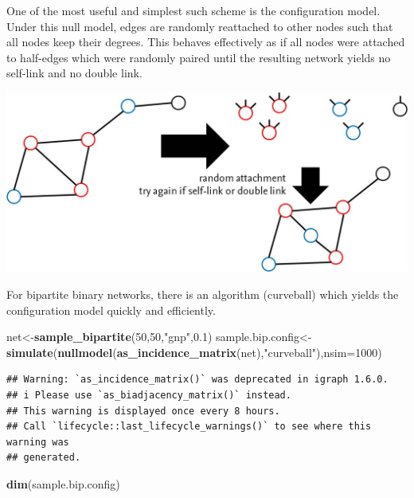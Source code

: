 \documentclass[
]{book}
\newenvironment{Shaded}{\begin{snugshade}}{\end{snugshade}}
\newcommand{\AttributeTok}[1]{\textcolor[rgb]{0.13,0.29,0.53}{#1}}
\newcommand{\DecValTok}[1]{\textcolor[rgb]{0.00,0.00,0.81}{#1}}
\newcommand{\FloatTok}[1]{\textcolor[rgb]{0.00,0.00,0.81}{#1}}
\newcommand{\FunctionTok}[1]{\textcolor[rgb]{0.13,0.29,0.53}{\textbf{#1}}}
\newcommand{\NormalTok}[1]{#1}
\newcommand{\OtherTok}[1]{\textcolor[rgb]{0.56,0.35,0.01}{#1}}
\newcommand{\StringTok}[1]{\textcolor[rgb]{0.31,0.60,0.02}{#1}}
\theoremstyle{definition}
\theoremstyle{definition}
\theoremstyle{definition}
\theoremstyle{definition}
\theoremstyle{remark}
\begin{document}
One of the most useful and simplest such scheme is the configuration model. Under this null model, edges are randomly reattached to other nodes such that all nodes keep their degrees. This behaves effectively as if all nodes were attached to half-edges which were randomly paired until the resulting network yields no self-link and no double link.

\includegraphics[width=19.6in]{fig06Networks/configuration}

For bipartite binary networks, there is an algorithm (curveball) which yields the configuration model quickly and efficiently.

\begin{Shaded}
\begin{Highlighting}[]
\NormalTok{net}\OtherTok{\textless{}{-}}\FunctionTok{sample\_bipartite}\NormalTok{(}\DecValTok{50}\NormalTok{,}\DecValTok{50}\NormalTok{,}\StringTok{"gnp"}\NormalTok{,}\FloatTok{0.1}\NormalTok{)}
\NormalTok{sample.bip.config}\OtherTok{\textless{}{-}}\FunctionTok{simulate}\NormalTok{(}\FunctionTok{nullmodel}\NormalTok{(}\FunctionTok{as\_incidence\_matrix}\NormalTok{(net),}\StringTok{"curveball"}\NormalTok{),}\AttributeTok{nsim=}\DecValTok{1000}\NormalTok{)}
\end{Highlighting}
\end{Shaded}

\begin{verbatim}
## Warning: `as_incidence_matrix()` was deprecated in igraph 1.6.0.
## i Please use `as_biadjacency_matrix()` instead.
## This warning is displayed once every 8 hours.
## Call `lifecycle::last_lifecycle_warnings()` to see where this warning was
## generated.
\end{verbatim}

\begin{Shaded}
\begin{Highlighting}[]
\FunctionTok{dim}\NormalTok{(sample.bip.config)}
\end{Highlighting}
\end{Shaded}
\end{document}
